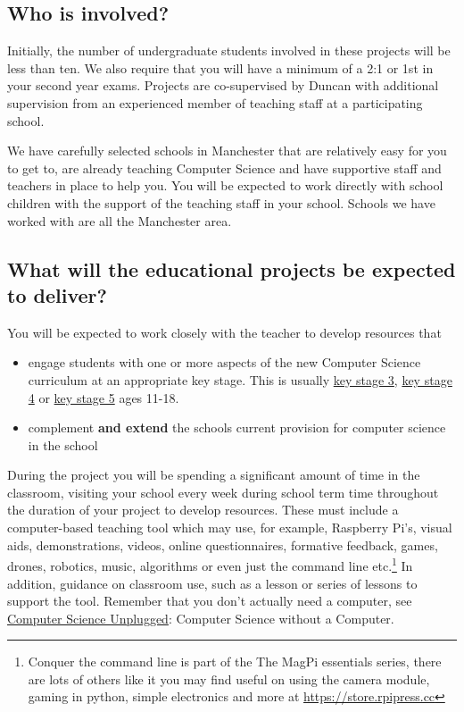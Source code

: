 \documentclass[
  12pt,
]{book}
\providecommand{\tightlist}{%
  \setlength{\itemsep}{0pt}\setlength{\parskip}{0pt}}
\begin{document}
\hypertarget{who-is-involved}{%
\subsection{Who is involved?}\label{who-is-involved}}

Initially, the number of undergraduate students involved in these projects will be less than ten. We also require that you will have a minimum of a 2:1 or 1st in your second year exams. Projects are co-supervised by Duncan with additional supervision from an experienced member of teaching staff at a participating school.

We have carefully selected schools in Manchester that are relatively easy for you to get to, are already teaching Computer Science and have supportive staff and teachers in place to help you. You will be expected to work directly with school children with the support of the teaching staff in your school. Schools we have worked with are all the Manchester area.

\hypertarget{what-will-the-educational-projects-be-expected-to-deliver}{%
\subsection{What will the educational projects be expected to deliver?}\label{what-will-the-educational-projects-be-expected-to-deliver}}

You will be expected to work closely with the teacher to develop resources that

\begin{itemize}
\tightlist
\item
  engage students with one or more aspects of the new Computer Science curriculum at an appropriate key stage. This is usually \href{https://en.wikipedia.org/wiki/Key_Stage_3}{key stage 3}, \href{https://en.wikipedia.org/wiki/Key_Stage_4}{key stage 4} or \href{https://en.wikipedia.org/wiki/Key_Stage_5}{key stage 5} ages 11-18.
\item
  complement \textbf{and extend} the schools current provision for computer science in the school
\end{itemize}

During the project you will be spending a significant amount of time in the classroom, visiting your school every week during school term time throughout the duration of your project to develop resources. These must include a computer-based teaching tool which may use, for example, Raspberry Pi's, visual aids, demonstrations, videos, online questionnaires, formative feedback, games, drones, robotics, music, \citep{Aaron2016} algorithms \citep{Kubica2012} or even just the command line \citep{conquerthecommandline} etc.\footnote{Conquer the command line is part of the The MagPi essentials series, there are lots of others like it you may find useful on using the camera module, gaming in python, simple electronics and more at \url{https://store.rpipress.cc}} In addition, guidance on classroom use, such as a lesson or series of lessons to support the tool. Remember that you don't actually need a computer, see \href{https://csunplugged.org}{Computer Science Unplugged}: Computer Science without a Computer. \citep{Bell2018}
\end{document}
